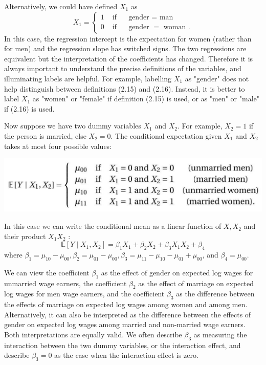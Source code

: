 \documentclass[10pt]{article}
\begin{document}
Alternatively, we could have defined $X_{1}$ as
$$
X_{1}= \begin{cases}1 & \text { if } \quad \text { gender }=\text { man } \\ 0 & \text { if } \quad \text { gender }=\text { woman } .\end{cases}
$$
In this case, the regression intercept is the expectation for women (rather than for men) and the regression slope has switched signs. The two regressions are equivalent but the interpretation of the coefficients has changed. Therefore it is always important to understand the precise definitions of the variables, and illuminating labels are helpful. For example, labelling $X_{1}$ as "gender" does not help distinguish between definitions (2.15) and (2.16). Instead, it is better to label $X_{1}$ as "women" or "female" if definition (2.15) is used, or as "men" or "male" if (2.16) is used.

Now suppose we have two dummy variables $X_{1}$ and $X_{2}$. For example, $X_{2}=1$ if the person is married, else $X_{2}=0$. The conditional expectation given $X_{1}$ and $X_{2}$ takes at most four possible values:

\includegraphics[max width=\textwidth]{2022_09_17_efa0deee3441d06e0b66g-21}

In this case we can write the conditional mean as a linear function of $X, X_{2}$ and their product $X_{1} X_{2}$ :
$$
\mathbb{E}\left[Y \mid X_{1}, X_{2}\right]=\beta_{1} X_{1}+\beta_{2} X_{2}+\beta_{3} X_{1} X_{2}+\beta_{4}
$$
where $\beta_{1}=\mu_{10}-\mu_{00}, \beta_{2}=\mu_{01}-\mu_{00}, \beta_{3}=\mu_{11}-\mu_{10}-\mu_{01}+\mu_{00}$, and $\beta_{4}=\mu_{00}$.

We can view the coefficient $\beta_{1}$ as the effect of gender on expected log wages for unmarried wage earners, the coefficient $\beta_{2}$ as the effect of marriage on expected log wages for men wage earners, and the coefficient $\beta_{3}$ as the difference between the effects of marriage on expected log wages among women and among men. Alternatively, it can also be interpreted as the difference between the effects of gender on expected log wages among married and non-married wage earners. Both interpretations are equally valid. We often describe $\beta_{3}$ as measuring the interaction between the two dummy variables, or the interaction effect, and describe $\beta_{3}=0$ as the case when the interaction effect is zero.
\end{document}
